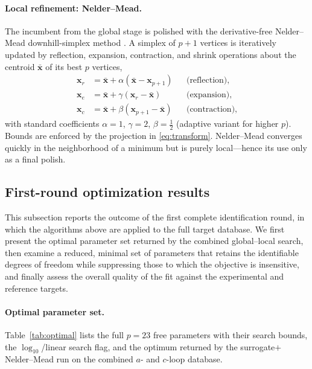 \documentclass{article}
\newcommand{\xv}{\bm{x}}
\begin{document}
\paragraph{Local refinement: Nelder--Mead.}
The incumbent from the global stage is polished with the derivative-free
Nelder–Mead downhill-simplex method \citep{NelderMead1965}. A simplex of $p+1$
vertices is iteratively updated by reflection, expansion, contraction, and shrink
operations about the centroid $\bar{\xv}$ of its best $p$ vertices,
\begin{align}
  \xv_{r} &= \bar{\xv}+\alpha(\bar{\xv}-\xv_{p+1}) &&\text{(reflection)},\\
  \xv_{e} &= \bar{\xv}+\gamma(\xv_{r}-\bar{\xv})   &&\text{(expansion)},\\
  \xv_{c} &= \bar{\xv}+\beta(\xv_{p+1}-\bar{\xv})  &&\text{(contraction)},
\end{align}
with standard coefficients $\alpha=1$, $\gamma=2$, $\beta=\tfrac12$ (adaptive
variant for higher $p$). Bounds are enforced by the projection in
\eqref{eq:transform}. Nelder–Mead converges quickly in the neighborhood of a
minimum but is purely local—hence its use only as a final polish.

\subsection{First-round optimization results}\label{sec:optresults}
This subsection reports the outcome of the first complete identification round, in which the algorithms above are applied to the full target database. We first present the optimal parameter set returned by the combined global--local search, then examine a reduced, minimal set of parameters that retains the identifiable degrees of freedom while suppressing those to which the objective is insensitive, and finally assess the overall quality of the fit against the experimental and reference targets.

\paragraph{Optimal parameter set.}
Table~\ref{tab:optimal} lists the full $p=23$ free parameters with their search
bounds, the $\log_{10}$/linear search flag, and the optimum returned by the
surrogate$+$Nelder--Mead run on the combined $a$- and $c$-loop database.
\end{document}
